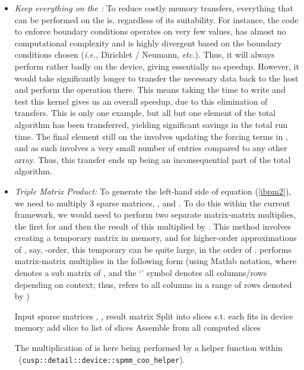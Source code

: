 \begin{itemize}

\item \emph{Keep everything on the {\gpu}: } To reduce costly memory transfers, everything that can be performed on the {\gpu} is, regardless of its suitability. For instance, the code to enforce boundary conditions operates on very few values, has almost no computational complexity and is highly divergent based on the boundary conditions chosen (\emph{i.e.}, Dirichlet / Neumann, \emph{etc.}). Thus, it will always perform rather badly on the device, giving essentially no speedup. However, it would take significantly longer to transfer the necessary data back to the host and perform the operation there. This means taking the time to write and test this kernel gives us an overall speedup, due to this elimination of transfers. This is only one example, but all but one element of the total algorithm has been transferred, yielding significant savings in the total run time. The final element still on the {\cpu} involves updating the forcing terms in , and as such involves a very small number of entries compared to any other array. Thus, this transfer ends up being an inconsequential part of the total algorithm.

\item \emph{Triple Matrix Product: } To generate the left-hand side of equation (\ref{ibpm2}), we need to multiply 3 sparse matrices, ,  and . To do this within the current {\cusp} framework, we would need to perform two separate matrix-matrix multiplies, the first for  and then the result of this multiplied by . This method involves creating a temporary matrix in memory, and for higher-order approximations of , say, -order, this temporary can be quite large, in the order of . {\cusp} performs matrix-matrix multiplies in the following form (using Matlab notation, where  denotes a sub matrix of , and the `' symbol denotes all columns/rows depending on context; thus,  refers to all columns in a range of rows denoted by )

\begin{algorithmic}
	\REQUIRE Input sparse matrices , , result matrix 
	\STATE Split  into slices  s.t. each  fits in device memory
		\STATE 
		\STATE add slice to list of slices
	\ENDFOR
	\STATE Assemble  from all computed slices
\end{algorithmic}

\noindent
The multiplication of  is here being performed by a helper function within \cusp\ (\verb|cusp::detail::device::spmm_coo_helper|).


\end{itemize}
